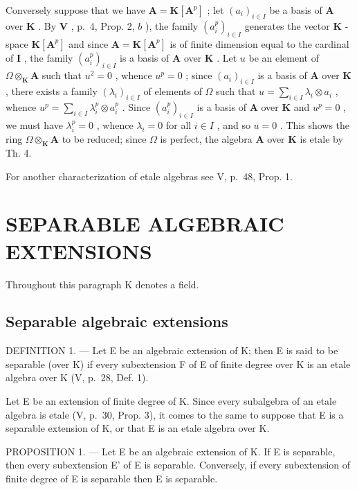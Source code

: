 Conversely suppose that we have \(\mathbf{A} = \mathbf{K}[\mathbf{A}^p]\) ; let \((a_i)_{i\in I}\) be a basis of \(\mathbf{A}\) over \(\mathbf{K}\) . By \(\mathbf{V}\) , p.~4, Prop. 2, \(b\) ), the family \((a_i^p)_{i\in I}\) generates the vector \(\mathbf{K}\) -space \(\mathbf{K}[\mathbf{A}^p]\) and since \(\mathbf{A} = \mathbf{K}[\mathbf{A}^p]\) is of finite dimension equal to the cardinal of \(\mathbf{I}\) , the family \((a_i^p)_{i\in I}\) is a basis of \(\mathbf{A}\) over \(\mathbf{K}\) . Let \(u\) be an element of \(\Omega \otimes_{\mathbf{K}} \mathbf{A}\) such that \(u^2 = 0\) , whence \(u^p = 0\) ; since \((a_i)_{i\in I}\) is a basis of \(\mathbf{A}\) over \(\mathbf{K}\) , there exists a family \((\lambda_i)_{i\in I}\) of elements of \(\Omega\) such that \(u = \sum_{i\in I} \lambda_i \otimes a_i\) , whence \(u^p = \sum_{i\in I} \lambda_i^p \otimes a_i^p\) . Since \((a_i^p)_{i\in I}\) is a basis of \(\mathbf{A}\) over \(\mathbf{K}\) and \(u^p = 0\) , we must have \(\lambda_i^p = 0\) , whence \(\lambda_i = 0\) for all \(i\in I\) , and so \(u = 0\) . This shows the ring \(\Omega \otimes_{\mathbf{K}} \mathbf{A}\) to be reduced; since \(\Omega\) is perfect, the algebra \(\mathbf{A}\) over \(\mathbf{K}\) is etale by Th. 4.

For another characterization of etale algebras see V, p.~48, Prop. 1.

\section{SEPARABLE ALGEBRAIC EXTENSIONS}

Throughout this paragraph K denotes a field.

\subsection{Separable algebraic extensions}

DEFINITION 1. --- Let E be an algebraic extension of K; then E is said to be separable (over K) if every subextension F of E of finite degree over K is an etale algebra over K (V, p.~28, Def. 1).

Let E be an extension of finite degree of K. Since every subalgebra of an etale algebra is etale (V, p.~30, Prop. 3), it comes to the same to suppose that E is a separable extension of K, or that E is an etale algebra over K.

PROPOSITION 1. --- Let E be an algebraic extension of K. If E is separable, then every subextension E' of E is separable. Conversely, if every subextension of finite degree of E is separable then E is separable.

